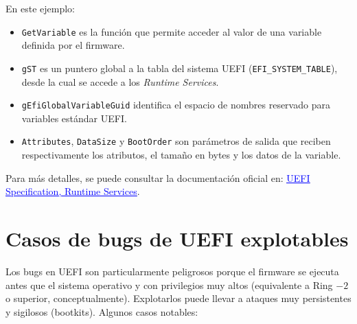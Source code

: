 \documentclass[a4paper,12pt]{article}
\begin{document}
En este ejemplo:

\begin{itemize}
  \item \texttt{GetVariable} es la función que permite acceder al valor de una variable definida por el firmware.
  \item \texttt{gST} es un puntero global a la tabla del sistema UEFI (\texttt{EFI_SYSTEM_TABLE}), desde la cual se accede a los \emph{Runtime Services}.
  \item \texttt{gEfiGlobalVariableGuid} identifica el espacio de nombres reservado para variables estándar UEFI.
  \item \texttt{Attributes}, \texttt{DataSize} y \texttt{BootOrder} son parámetros de salida que reciben respectivamente los atributos, el tamaño en bytes y los datos de la variable.
\end{itemize}

\noindent Para más detalles, se puede consultar la documentación oficial en: \href{https://uefi.org/specs/UEFI/2.10/08_Services_Runtime_Services.html}{\textcolor{blue}{\underline{UEFI Specification, Runtime Services}}}.

\section{Casos de bugs de UEFI explotables}
Los bugs en UEFI son particularmente peligrosos porque el firmware se ejecuta antes que el sistema operativo y con privilegios muy altos (equivalente a Ring $-2$ o superior, conceptualmente). Explotarlos puede llevar a ataques muy persistentes y sigilosos (bootkits). Algunos casos notables:
\end{document}
